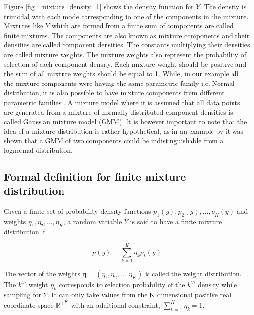 Figure \ref{fig : mixture_density_1} shows the density function for $Y$. The density is trimodal with each mode corresponding to one of the components in the mixture. Mixtures like $Y$ which are formed from a finite sum of components are called finite mixtures. The components are also known as mixture components and their densities are called component densities. The constants multiplying their densities are called mixture weights. The mixture weights also represent the probability of selection of each component density. Each mixture weight should be positive and the sum of all mixture weights should be equal to 1. While, in our example all the  mixture components were having the same parametric family i.e. Normal distribution, it is also possible to have mixture components from different parametric families \citep[pg. 4]{fruhwirth-schnatter_finite_2013}. A mixture model where it is assumed that all data points are generated from a mixture of normally distributed component densities is called Gaussian mixture model (GMM). It is however important to note that the idea of a mixture distribution is rather hypothetical, as in an example by \citet{titterington_statistical_1986} it was shown that a GMM of two components could be indistinguishable from a lognormal distribution.

\subsection{Formal definition for finite mixture distribution}
\label{subsec : formal_def_mixture_dist}
Given a finite set of probability density functions $p_1(y), p_2(y), \ldots, p_K(y)$ and weights $\eta_1, \eta_2, \ldots, \eta_K$, a random variable $Y$ is said to have a finite mixture distribution if

$$p(y) = \sum_{k=1}^{K} \eta_{k} p_{k}(y)$$

The vector of the weights $\boldsymbol{\eta} = (\eta_1, \eta_2, \ldots, \eta_K)$ is called the weight distribution. The $k^{th}$ weight $\eta_{k}$ corresponds to selection probability of the $k^{th}$ density while sampling for $Y$. It can only take values from the K dimensional positive real coordinate space ${\mathbb{R}^{+}}^K$ with an additional constraint, $\sum_{k=1}^{K} \eta_{k} = 1$.\\


